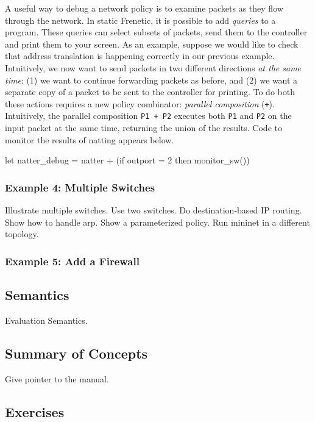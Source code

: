\documentclass{article}
\newcommand{\code}[1]{\texttt{#1}}
\begin{document}
A useful way to debug a network policy is to examine packets as they
flow through the network.  In static Frenetic, it is possible to add 
\emph{queries} to a program.  These queries can select subsets of packets,
send them to the controller and print them to your screen.  As
an example, suppose we would like to check that address translation 
is happening correctly in our previous example.  Intuitively, we now
want to send packets in two different directions \emph{at the same time}:
(1) we want to continue forwarding packets as before, and (2) we want
a separate copy of a packet to be sent to the controller for printing.
To do both these actions requires a new policy combinator: 
\emph{parallel composition} (\code{+}).  Intuitively, the parallel
composition \code{P1 + P2} executes both \code{P1} and \code{P2}
on the input packet at the same time, returning the union of the results.
Code to monitor the results of natting appears below.
%
\begin{progeg}
let natter\_debug = 
  natter + (if outport = 2 then monitor\_sw())
\end{progeg}
%


\subsubsection{Example 4: Multiple Switches}
Illustrate multiple switches.  Use two switches.  Do destination-based
IP routing.  Show how to handle arp.  Show a parameterized policy.
Run mininet in a different topology.

\subsubsection{Example 5:  Add a Firewall}

\subsection{Semantics}

Evaluation Semantics.

\subsection{Summary of Concepts}

Give pointer to the manual.

\subsection{Exercises}
\end{document}
